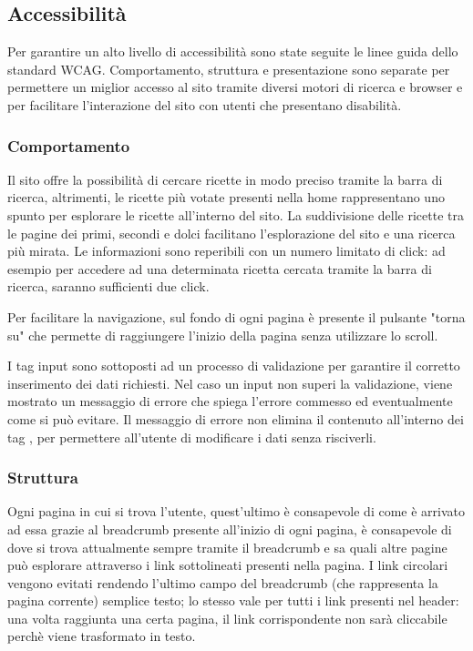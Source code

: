 \subsection{Accessibilità}
\label{sub:accessibilità}
Per garantire un alto livello di accessibilità sono state seguite le linee guida dello standard WCAG. Comportamento, struttura e presentazione sono separate per permettere un miglior accesso al sito tramite diversi motori di ricerca e browser e per facilitare l'interazione del sito con utenti che presentano disabilità.

\subsubsection{Comportamento}
Il sito offre la possibilità di cercare ricette in modo preciso tramite la barra di ricerca, altrimenti, le ricette più votate presenti nella home rappresentano uno spunto per esplorare le ricette all'interno del sito. La suddivisione delle ricette tra le pagine dei primi, secondi e dolci facilitano l'esplorazione del sito e una ricerca più mirata. Le informazioni sono reperibili con un numero limitato di click: ad esempio per accedere ad una determinata ricetta cercata tramite la barra di ricerca, saranno sufficienti due click.

Per facilitare la navigazione, sul fondo di ogni pagina è presente il pulsante "torna su" che permette di raggiungere l'inizio della pagina senza utilizzare lo scroll.

I tag input sono sottoposti ad un processo di validazione per garantire il corretto inserimento dei dati richiesti. Nel caso un input non superi la validazione, viene mostrato un messaggio di errore che spiega l'errore commesso ed eventualmente come si può evitare. Il messaggio di errore non elimina il contenuto all'interno dei tag , per permettere all'utente di modificare i dati senza risciverli.

\subsubsection{Struttura}
Ogni pagina in cui si trova l'utente, quest'ultimo è consapevole di come è arrivato ad essa grazie al breadcrumb presente all'inizio di ogni pagina, è consapevole di dove si trova attualmente sempre tramite il breadcrumb e sa quali altre pagine può esplorare attraverso i link sottolineati presenti nella pagina. I link circolari vengono evitati rendendo l'ultimo campo del breadcrumb (che rappresenta la pagina corrente) semplice testo; lo stesso vale per tutti i link presenti nel header: una volta raggiunta una certa pagina, il link corrispondente non sarà cliccabile perchè viene trasformato in testo.

